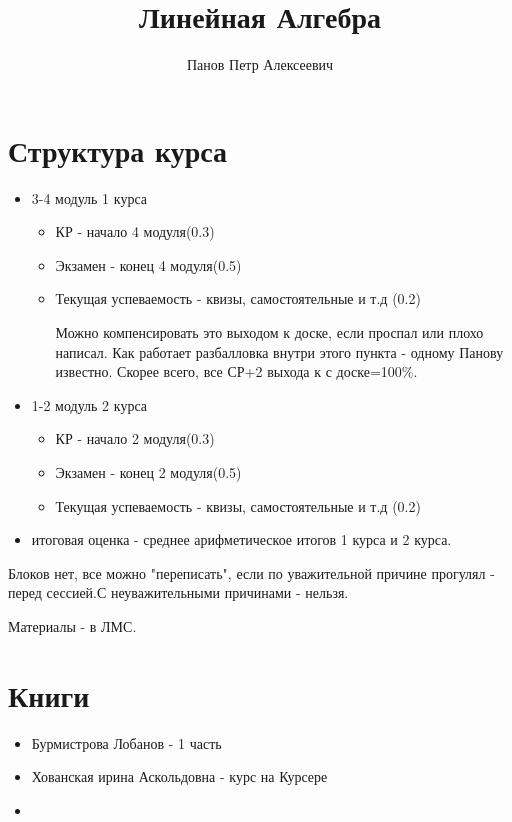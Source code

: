 \documentclass{article}
\title{Линейная Алгебра}
\author{Панов Петр Алексеевич}
\begin{document}
\maketitle
 
\tableofcontents

\section*{Структура курса}
\begin{itemize}
\item 3-4 модуль 1 курса
\begin{itemize}
\item КР - начало 4 модуля(0.3)
\item Экзамен - конец 4 модуля(0.5)
\item Текущая успеваемость - квизы, самостоятельные и т.д (0.2)

Можно компенсировать это выходом к доске, если проспал или плохо написал. Как работает разбалловка внутри этого пункта - одному Панову известно. Скорее всего, все СР+2 выхода к с доске=100\%.
\end{itemize}

\item 1-2 модуль 2 курса
\begin{itemize}
\item КР - начало 2 модуля(0.3)
\item Экзамен - конец 2 модуля(0.5)
\item Текущая успеваемость - квизы, самостоятельные и т.д (0.2)
\end{itemize}
\item итоговая оценка - среднее арифметическое итогов 1 курса и 2 курса.
\end{itemize}

Блоков нет, все можно "переписать", если по уважительной причине прогулял - перед сессией.С неуважительными причинами - нельзя.

Материалы - в ЛМС.

\section*{Книги}
\begin{itemize}
\item Бурмистрова Лобанов - 1 часть
\item Хованская ирина Аскольдовна - курс на Курсере
\item
\end{itemize}
\end{document}
